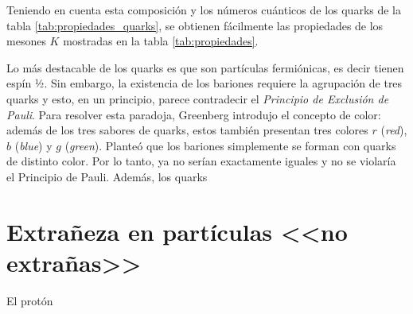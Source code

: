 Teniendo en cuenta esta composición y los números cuánticos de los quarks de la tabla \ref{tab:propiedades_quarks}, se obtienen fácilmente las propiedades de los mesones $K$ mostradas en la tabla \ref{tab:propiedades}.

Lo más destacable de los quarks es que son partículas fermiónicas, es decir tienen espín ½. Sin embargo, la existencia de los bariones requiere la agrupación de tres quarks y esto, en un principio, parece contradecir el \textit{Principio de Exclusión de Pauli}. Para resolver esta paradoja, Greenberg introdujo el concepto de color: además de los tres sabores de quarks, estos también presentan tres colores $r$ (\textit{red}), $b$ (\textit{blue}) y $g$ (\textit{green}). Planteó que los bariones simplemente se forman con quarks de distinto color. Por lo tanto, ya no serían exactamente iguales y no se violaría el Principio de Pauli. Además, los quarks


\section{Extrañeza en partículas <<no extrañas>>}
\label{cap:non-strange_particles}
El protón
